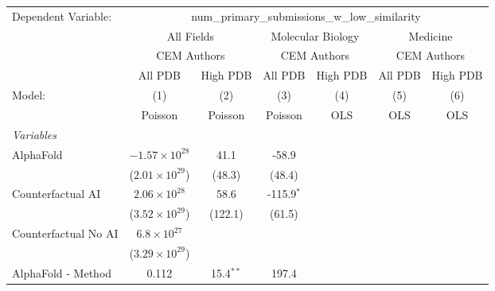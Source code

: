 \begingroup
\centering
\begin{tabular}{lcccccc}
   \tabularnewline \midrule \midrule
   Dependent Variable: & \multicolumn{6}{c}{num\_primary\_submissions\_w\_low\_similarity}\\
 & \multicolumn{2}{c}{All Fields} & \multicolumn{2}{c}{Molecular Biology} & \multicolumn{2}{c}{Medicine} \\
\cmidrule(lr){2-3} \cmidrule(lr){4-5} \cmidrule(lr){6-7}
 & \multicolumn{2}{c}{CEM Authors} & \multicolumn{2}{c}{CEM Authors} & \multicolumn{2}{c}{CEM Authors} \\
\cmidrule(lr){2-3} \cmidrule(lr){4-5} \cmidrule(lr){6-7}
 & \multicolumn{1}{c}{All PDB} & \multicolumn{1}{c}{High PDB} & \multicolumn{1}{c}{All PDB} & \multicolumn{1}{c}{High PDB} & \multicolumn{1}{c}{All PDB} & \multicolumn{1}{c}{High PDB} \\
\cmidrule(lr){2-2} \cmidrule(lr){3-3} \cmidrule(lr){4-4} \cmidrule(lr){5-5} \cmidrule(lr){6-6} \cmidrule(lr){7-7}
   Model:                                                  & (1)                     & (2)         & (3)          & (4)  & (5)  & (6)\\  
                                                           &  Poisson                & Poisson     & Poisson      & OLS  & OLS  & OLS\\  
   \midrule
   \emph{Variables}\\
   AlphaFold                                               & $-1.57\times 10^{28}$   & 41.1        & -58.9        &      &      &   \\   
                                                           & ($2.01\times 10^{29}$)  & (48.3)      & (48.4)       &      &      &   \\   
   Counterfactual AI                                       & $2.06\times 10^{28}$    & 58.6        & -115.9$^{*}$ &      &      &   \\   
                                                           & ($3.52\times 10^{29}$)  & (122.1)     & (61.5)       &      &      &   \\   
   Counterfactual No AI                                    & $6.8\times 10^{27}$     &             &              &      &      &   \\   
                                                           & ($3.29\times 10^{29}$)  &             &              &      &      &   \\   
   AlphaFold - Method                                      & 0.112                   & 15.4$^{**}$ & 197.4        &      &      &   \\   

\end{tabular}

